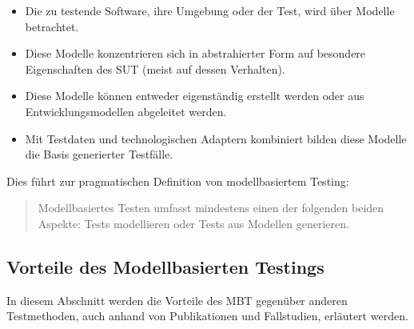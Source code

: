 \begin{itemize}
\item Die zu testende Software, ihre Umgebung oder der Test, wird über Modelle betrachtet.
\item Diese Modelle konzentrieren sich in abstrahierter Form auf besondere Eigenschaften des \Gls{SUT} (meist auf dessen Verhalten).
\item Diese Modelle können entweder eigenständig erstellt werden oder aus Entwicklungsmodellen abgeleitet werden.
\item Mit Testdaten und technologischen Adaptern kombiniert bilden diese Modelle die Basis generierter Testfälle.
\end{itemize}

Dies führt zur pragmatischen Definition von modellbasiertem Testing:

\begin{quote}
Modellbasiertes Testen umfasst mindestens einen der folgenden beiden Aspekte: Tests modellieren oder Tests aus Modellen generieren.
\end{quote}

\subsection{Vorteile des Modellbasierten Testings}
\label{sec:mbt_vorteile}
In diesem Abschnitt werden die Vorteile des \Gls{MBT} gegenüber anderen Testmethoden, auch anhand von Publikationen und Fallstudien, erläutert werden.


